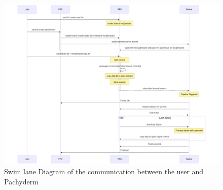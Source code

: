 \begin{figure}[H]
  \centering
  \includegraphics[width=14cm]{graphics/pipeline_communication_sld.png}
  \caption[Swim lane Diagram of the communication between the user and Pachyderm]{Swim lane Diagram of the communication between the user and Pachyderm\footnotemark}
  \label{abb:pipeline_communication_sld}
\end{figure}

\newpage



\label{appendix:minikube_installation_instructions}


\label{appendix:cicd_installation_instructions}

